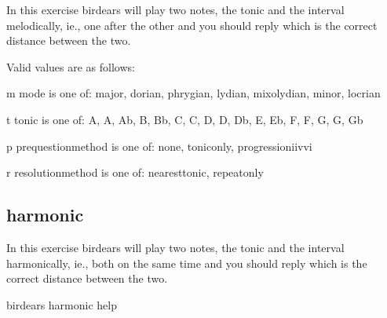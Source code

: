 \documentclass[letterpaper,10pt,english]{sphinxmanual}
\begin{document}
\begin{sphinxVerbatim}[commandchars=\\\{\}]
  In this exercise birdears will play two notes, the tonic and the interval
  melodically, ie., one after the other and you should reply which is the
  correct distance between the two.

  Valid values are as follows:

  \PYGZhy{}m \PYGZlt{}mode\PYGZgt{} is one of: major, dorian, phrygian, lydian, mixolydian, minor,
  locrian

  \PYGZhy{}t \PYGZlt{}tonic\PYGZgt{} is one of: A, A\PYGZsh{}, Ab, B, Bb, C, C\PYGZsh{}, D, D\PYGZsh{}, Db, E, Eb, F, F\PYGZsh{}, G,
  G\PYGZsh{}, Gb

  \PYGZhy{}p \PYGZlt{}prequestion\PYGZus{}method\PYGZgt{} is one of: none, tonic\PYGZus{}only, progression\PYGZus{}i\PYGZus{}iv\PYGZus{}v\PYGZus{}i

  \PYGZhy{}r \PYGZlt{}resolution\PYGZus{}method\PYGZgt{} is one of: nearest\PYGZus{}tonic, repeat\PYGZus{}only
\end{sphinxVerbatim}


\subsection{harmonic}
\label{\detokenize{index:harmonic}}
In this exercise birdears will play two notes, the tonic and the interval
harmonically, ie., both on the same time and you should reply which is the
correct distance between the two.

\begin{sphinxVerbatim}[commandchars=\\\{\}]
birdears harmonic \PYGZhy{}\PYGZhy{}help
\end{sphinxVerbatim}
\end{document}
